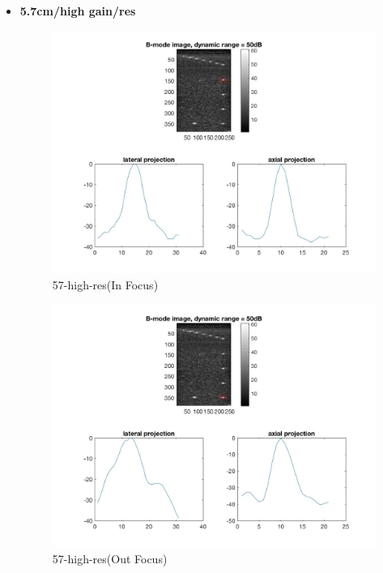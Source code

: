 \documentclass[12pts,a4paper]{article}
\begin{document}
\begin{itemize}
\item{\textbf{5.7cm/high gain/res}}
\begin{center}
\end{center}
\begin{figure}[h]
    \centering
    \includegraphics[width=1.0\textwidth]{img_hw1/57-high-res1.jpg}
    \caption{57-high-res(In Focus)}
    \label{fig:mesh1}
\end{figure}
\pagebreak
\begin{figure}[h]
    \centering
    \includegraphics[width=1.0\textwidth]{img_hw1/57-high-res2.jpg}
    \caption{57-high-res(Out Focus)}
    \label{fig:mesh1}
\end{figure}

\end{itemize}
\end{document}

